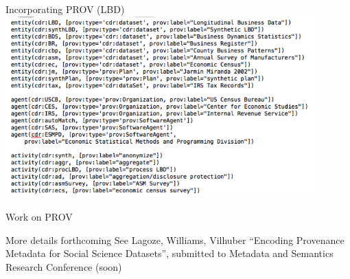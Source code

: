 \begin{frame}{Incorporating PROV (LBD)}
\includegraphics[width=0.9\textwidth]{LBD_Prov_simplified_text.png}
\end{frame}

\begin{frame}{Work on PROV}
\begin{block}{More details forthcoming}
See Lagoze, Williams, Vilhuber ``Encoding Provenance Metadata for
Social Science Datasets'', submitted to Metadata and Semantics Research Conference (soon)
\end{block}
\end{frame}

%

